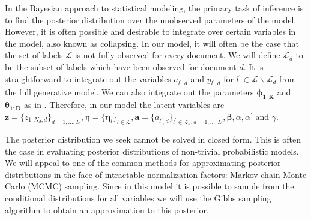 
\label{sec:inference} In the Bayesian approach to statistical modeling,
the primary task of inference is to find the posterior distribution
over the unobserved parameters of the model. However, it is often
possible and desirable to integrate over certain variables in the
model, also known as collapsing. In our model, it will often be the
case that the set of labels $\mathcal{L}$ is not fully observed for
every document. We will define $\mathcal{L}_{d}$ to be the subset
of labels which have been observed for document $d$. It is straightforward
to integrate out the variables $a_{l^{\prime},d}$ and $y_{l^{\prime},d}$
for $l^{\prime}\in\mathcal{L}\backslash\mathcal{L}_{d}$ from the
full generative model. We can also integrate out the parameters $\mathbf{\phi_{1:K}}$
and $\mathbf{\theta_{1:D}}$ as in \citet{Griffiths04}. Therefore,
in our model the latent variables are $\mathbf{z}=\{z_{1:N_{d},d}\}_{d=1,\ldots,D},\boldsymbol\eta=\{\boldsymbol\eta_{l}\}_{l\in\mathcal{L}},\mathbf{a}=\{a_{l^{\prime},d}\}_{l^{\prime}\in\mathcal{L}_{d},d=1,\ldots,D},\boldsymbol\beta,\alpha,\alpha^{\prime}$
and $\gamma$.

The posterior distribution we seek cannot be solved in closed form.
This is often the case in evaluating posterior distributions of non-trivial
probabilistic models. We will appeal to one of the common methods
for approximating posterior distributions in the face of intractable
normalization factors: Markov chain Monte Carlo (MCMC) sampling. Since
in this model it is possible to sample from the conditional distributions
for all variables we will use the Gibbs sampling algorithm to obtain
an approximation to this posterior. %



